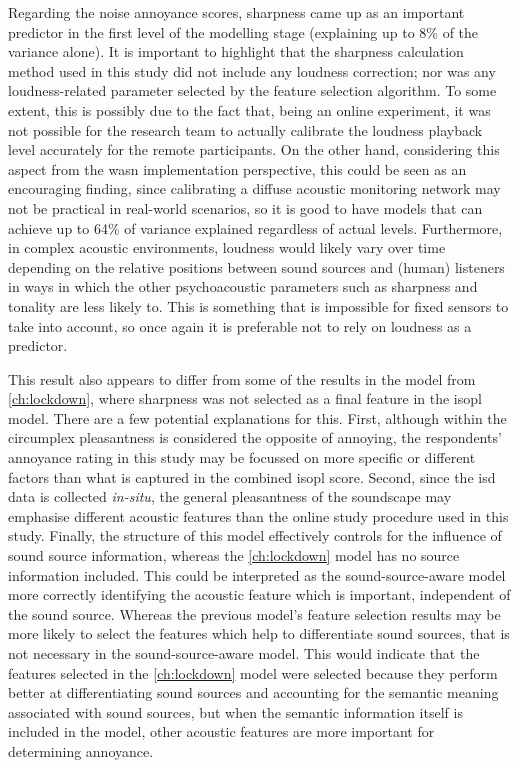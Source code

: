 Regarding the noise annoyance scores, sharpness came up as an important predictor in the first level of the modelling stage (explaining up to 8\% of the variance alone). It is important to highlight that the sharpness calculation method used in this study did not include any loudness correction; nor was any loudness-related parameter selected by the feature selection algorithm. To some extent, this is possibly due to the fact that, being an online experiment, it was not possible for the research team to actually calibrate the loudness playback level accurately for the remote participants. On the other hand, considering this aspect from the \gls{wasn} implementation perspective, this could be seen as an encouraging finding, since calibrating a diffuse acoustic monitoring network may not be practical in real-world scenarios, so it is good to have models that can achieve up to 64\% of variance explained regardless of actual levels. Furthermore, in complex acoustic environments, loudness would likely vary over time depending on the relative positions between sound sources and (human) listeners in ways in which the other psychoacoustic parameters such as sharpness and tonality are less likely to. This is something that is impossible for fixed sensors to take into account, so once again it is preferable not to rely on loudness as a predictor.

This result also appears to differ from some of the results in the model from \cref{ch:lockdown}, where sharpness was not selected as a final feature in the \gls{isopl} model. There are a few potential explanations for this. First, although within the circumplex pleasantness is considered the opposite of annoying, the respondents' annoyance rating in this study may be focussed on more specific or different factors than what is captured in the combined \gls{isopl} score. Second, since the \gls{isd} data is collected \emph{in-situ}, the general pleasantness of the soundscape may emphasise different acoustic features than the online study procedure used in this study. Finally, the structure of this model effectively controls for the influence of sound source information, whereas the \cref{ch:lockdown} model has no source information included. This could be interpreted as the sound-source-aware model more correctly identifying the acoustic feature which is important, independent of the sound source. Whereas the previous model's feature selection results may be more likely to select the features which help to differentiate sound sources, that is not necessary in the sound-source-aware model. This would indicate that the features selected in the \cref{ch:lockdown} model were selected because they perform better at differentiating sound sources and accounting for the semantic meaning associated with sound sources, but when the semantic information itself is included in the model, other acoustic features are more important for determining annoyance. 

